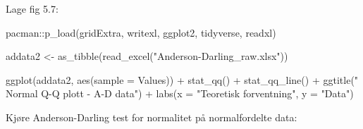 \documentclass[
]{book}
\newenvironment{Shaded}{\begin{snugshade}}{\end{snugshade}}
\newcommand{\AttributeTok}[1]{\textcolor[rgb]{0.77,0.63,0.00}{#1}}
\newcommand{\FunctionTok}[1]{\textcolor[rgb]{0.00,0.00,0.00}{#1}}
\newcommand{\NormalTok}[1]{#1}
\newcommand{\OtherTok}[1]{\textcolor[rgb]{0.56,0.35,0.01}{#1}}
\newcommand{\SpecialCharTok}[1]{\textcolor[rgb]{0.00,0.00,0.00}{#1}}
\newcommand{\StringTok}[1]{\textcolor[rgb]{0.31,0.60,0.02}{#1}}
\begin{document}
\begin{Shaded}
\end{Shaded}

Lage fig 5.7:

\begin{Shaded}
\begin{Highlighting}[]
\NormalTok{pacman}\SpecialCharTok{::}\FunctionTok{p\_load}\NormalTok{(gridExtra, writexl, ggplot2, tidyverse, readxl)}

\NormalTok{addata2 }\OtherTok{\textless{}{-}} \FunctionTok{as\_tibble}\NormalTok{(}\FunctionTok{read\_excel}\NormalTok{(}\StringTok{"Anderson{-}Darling\_raw.xlsx"}\NormalTok{))}

\FunctionTok{ggplot}\NormalTok{(addata2, }\FunctionTok{aes}\NormalTok{(}\AttributeTok{sample =}\NormalTok{ Values)) }\SpecialCharTok{+}
  \FunctionTok{stat\_qq}\NormalTok{() }\SpecialCharTok{+}
  \FunctionTok{stat\_qq\_line}\NormalTok{() }\SpecialCharTok{+}
  \FunctionTok{ggtitle}\NormalTok{(}\StringTok{" Normal Q{-}Q plott {-} A{-}D data"}\NormalTok{) }\SpecialCharTok{+} \FunctionTok{labs}\NormalTok{(}\AttributeTok{x =} \StringTok{"Teoretisk forventning"}\NormalTok{, }\AttributeTok{y =} \StringTok{"Data"}\NormalTok{)}
\end{Highlighting}
\end{Shaded}

Kjøre Anderson-Darling test for normalitet på normalfordelte data:

\begin{Shaded}
\end{Shaded}
\end{document}
